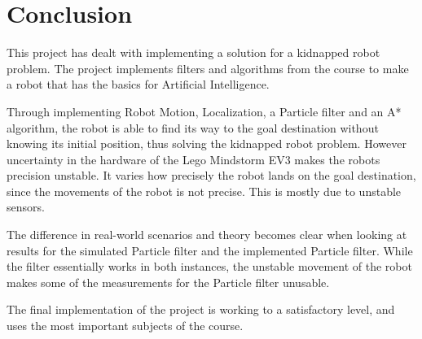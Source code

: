 \chapter{Conclusion}
\label{chp:conc}

This project has dealt with implementing a solution for a kidnapped robot problem. The project implements filters and algorithms from the course to make a robot that has the basics for Artificial Intelligence. 

Through implementing Robot Motion, Localization, a Particle filter and an A* algorithm, the robot is able to find its way to the goal destination without knowing its initial position, thus solving the kidnapped robot problem. However uncertainty in the hardware of the Lego Mindstorm EV3 makes the robots precision unstable. It varies how precisely the robot lands on the goal destination, since the movements of the robot is not precise. This is mostly due to unstable sensors. 

The difference in real-world scenarios and theory becomes clear when looking at  results for the simulated Particle filter and the implemented Particle filter. While the filter essentially works in both instances, the unstable movement of the robot makes some of the measurements for the Particle filter unusable.

The final implementation of the project is working to a satisfactory level, and uses the most important subjects of the course. 
 